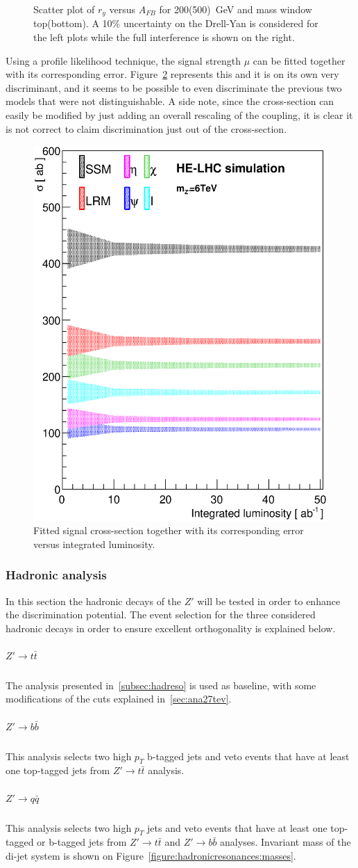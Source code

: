 \begin{figure}[!htb]
  \caption{Scatter plot of $r_y$ versus $A_{FB}$ for 200(500)~GeV and mass window top(bottom). A 10\% uncertainty on the Drell-Yan is considered for the left plots while the full interference is shown on the right.}
  \label{figure:lepana:afb_ry}
\end{figure}

Using a profile likelihood technique, the signal strength $\mu$ can be fitted together with its corresponding error. Figure~\ref{figure:lepana:sigma_vs_lumi} represents this and it is on its own very discriminant, and 
it seems to be possible to even discriminate the previous two models that were not distinguishable. A side note, since the cross-section can easily be modified by just adding an overall rescaling of the coupling, 
it is clear it is not correct to claim discrimination just out of the cross-section.

\begin{figure}[!htb]
  \centering
   \includegraphics[width=0.45\columnwidth]{Fig/27tev/sigma.eps}
    \caption{Fitted signal cross-section together with its corresponding error versus integrated luminosity.}
  \label{figure:lepana:sigma_vs_lumi}
\end{figure}


\subsubsection{Hadronic analysis}
\label{subsection:hadana}
In this section the hadronic decays of the $Z'$ will be tested in order to enhance the discrimination potential. The event selection for the three considered hadronic decays in order 
to ensure excellent orthogonality is explained below. 

\subparagraph{$Z' \rightarrow t\bar{t}$}
The analysis presented in~\ref{subsec:hadreso} is used as baseline, with some modifications of the cuts explained in~\ref{sec:ana27tev}.
\subparagraph{$Z' \rightarrow b\bar{b}$}
This analysis selects two high $p_T$ b-tagged jets and veto events that have at least one top-tagged jets from $Z' \rightarrow t\bar{t}$ analysis.
\subparagraph{$Z' \rightarrow q\bar{q}$}
This analysis selects two high $p_T$  jets and veto events that have at least one top-tagged or b-tagged jets from $Z' \rightarrow t\bar{t}$ and $Z' \rightarrow b\bar{b}$ analyses.
Invariant mass of the di-jet system is shown on Figure~\ref{figure:hadronicresonances:masses}.

